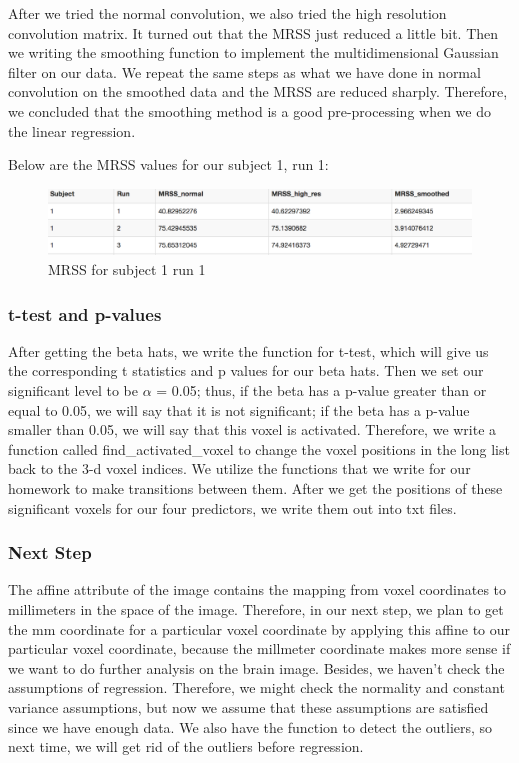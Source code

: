 \noindent
After we tried the normal convolution, we also tried the high resolution convolution matrix. It turned out that the MRSS just reduced a little bit. Then we writing the smoothing function to implement the multidimensional Gaussian filter on our data. We repeat the same steps as what we have done in normal convolution on the smoothed data and the MRSS are reduced sharply. Therefore, we concluded that the smoothing method is a good pre-processing when we do the linear regression. \newline

\noindent
Below are the MRSS values for our subject 1, run 1: \newline
\begin{figure}[H]
    \centering
        \includegraphics[scale=0.5]{../../plots/mrss_result001.png}
    \caption{MRSS for subject 1 run 1}
\end{figure}


\subsubsection{t-test and p-values}
\noindent
After getting the beta hats, we write the function for t-test, which will give us the corresponding t statistics and p values for our beta hats. Then we set our significant level to be $\alpha$ = 0.05; thus, if the beta has a p-value greater than or equal to 0.05, we will say that it is not significant; if the beta has a p-value smaller than 0.05, we will say that this voxel is activated. \newline
\noindent Therefore, we write a function called find\_activated\_voxel to change the voxel positions in the long list back to the 3-d voxel indices. We utilize the functions that we write for our homework to make transitions between them. After we get the positions of these significant voxels for our four predictors, we write them out into txt files. \newline


\subsubsection{Next Step}
\noindent
The affine attribute of the image contains the mapping from voxel coordinates to millimeters in the space of the image. Therefore, in our next step, we plan to get the mm coordinate for a particular voxel coordinate by applying this affine to our particular voxel coordinate, because the millmeter coordinate makes more sense if we want to do further analysis on the brain image. \newline
Besides, we haven't check the assumptions of regression. Therefore, we might check the normality and constant variance assumptions, but now we assume that these assumptions are satisfied since we have enough data. We also have the function to detect the outliers, so next time, we will get rid of the outliers before regression. \newline


